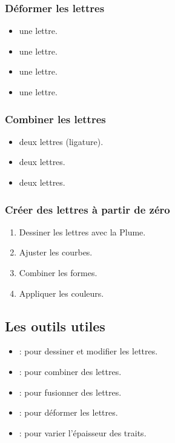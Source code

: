 \subsubsection{Déformer les lettres}

\begin{itemize}
    \item {} une lettre.
    \item {} une lettre.
    \item {} une lettre.
    \item {} une lettre.
\end{itemize}

\subsubsection{Combiner les lettres}

\begin{itemize}
    \item {} deux lettres (ligature).
    \item {} deux lettres.
    \item {} deux lettres.
\end{itemize}

\subsubsection{Créer des lettres à partir de zéro}

\begin{enumerate}
    \item Dessiner les lettres avec la Plume.
    \item Ajuster les courbes.
    \item Combiner les formes.
    \item Appliquer les couleurs.
\end{enumerate}

\subsection{Les outils utiles}

\begin{itemize}
    \item {} : pour dessiner et modifier les lettres.
    \item {} : pour combiner des lettres.
    \item {} : pour fusionner des lettres.
    \item {} : pour déformer les lettres.
    \item {} : pour varier l'épaisseur des traits.
\end{itemize}

